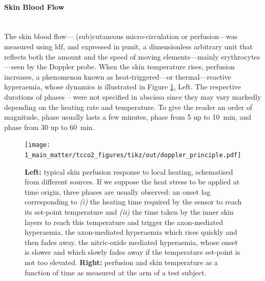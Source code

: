 \paragraph{Skin Blood Flow}\label{subsect:tcco2:subcut_bf}\mbox{}\\

The skin blood flow---\aka{} (sub)cutaneous micro-circulation or perfusion---was measured using \gls{ldf}, and expressed in \gls{punit}, a dimensionless arbitrary unit that reflects both the amount and the speed of moving elements---mainly erythrocytes---seen by the Doppler probe\cite{bonner1990}. When the skin temperature rises, perfusion increases, a phenomenon known as heat-triggered---or thermal---reactive hyperaemia\cite{minson2010}, whose dynamics is illustrated in Figure \ref{fig:tcco2:doppler_principle}, Left. The respective durations of phases -- were not specified in abscissa since they may vary markedly depending on the heating rate and temperature\cite{magerl1996, delpozzi2016}. To give the reader an order of magnitude, phase  usually lasts a few minutes, phase  from 5 up to 10~min, and phase  from 30 up to 60~min\cite{cracowski2006, frantz2012, minson2001, minson2010, roustit2012}.

\begin{figure}
	\centering
	\texttt{[image: 1\_main\_matter/tcco2\_figures/tikz/out/doppler\_principle.pdf]}
	\caption[Skin perfusion response to local heating.]{\textbf{Left:} typical skin perfusion response to local heating, schematised from different sources\cite{cracowski2006, frantz2012, minson2001, minson2010, roustit2012}. If we suppose the heat stress to be applied at time origin, three phases are usually observed:  an onset lag corresponding to \emph{(i)} the heating time required by the sensor to reach its set-point temperature and \emph{(ii)} the time taken by the inner skin layers to reach this temperature and trigger the axon-mediated hyperaemia.  the axon-mediated hyperaemia which rises quickly and then fades away.  the nitric-oxide mediated hyperaemia, whose onset is slower and which slowly fades away if the temperature set-point is not too elevated. \textbf{Right:} perfusion and skin temperature as a function of time as measured at the arm of a test subject.}\label{fig:tcco2:doppler_principle}
\end{figure}

